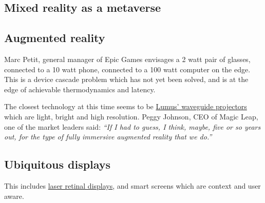 \subsection{Mixed reality as a metaverse}

\subsection{Augmented reality}
Marc Petit, general manager of Epic Games envisages a 2 watt pair of glasses, connected to a 10 watt phone, connected to a 100 watt computer on the edge. This is a device cascade problem which has not yet been solved, and is at the edge of achievable thermodynamics and latency.\par
The closest technology at this time seems to be \href{https://lumusvision.com/}{Lumus' waveguide projectors} which are light, bright and high resolution. 
Peggy Johnson, CEO of Magic Leap, one of the market leaders said: \textit{``If I had to guess, I think, maybe, five or so years out, for the type of fully immersive augmented reality that we do.''}
\subsection{Ubiquitous displays}
This includes \href{https://skarredghost.com/2022/06/28/mojo-vision-contact-tested-eye/}{laser retinal displays}, and smart screens which are context and user aware.
